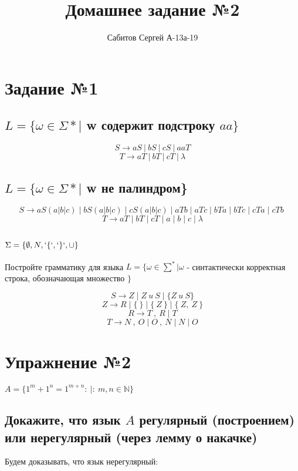 \documentclass[a4paper,12pt]{article}
\title{Домашнее задание №2}
\author{Сабитов Сергей А-13а-19}
\begin{document}
\maketitle


\section{Задание №1}
\subsection{$L = \{\omega \in \Sigma* |$  w содержит подстроку $aa\}$}

$$ S \rightarrow aS \:|\: bS \:|\: cS \:|\: aaT $$
$$ T \rightarrow aT \:|\: bT \:|\: cT \:|\: \lambda$$

\subsection{$L = \{\omega \in \Sigma* |$  w не палиндром\}}
$$S \rightarrow aS(a|b|c)\; | \; bS(a|b|c)\; | \;cS(a|b|c) \; | \; aTb \; | \; aTc\; | \; bTa\; | \;bTc \; | \;cTa \; | \;cTb \; $$
$$ T \rightarrow aT \; | \; bT \; | \; cT \; | \; a \; | \; b \; | \; c \; |\; \lambda$$

\subsection{$\Sigma = \{ \emptyset, N, `\{`,`\}`, \cup \} $ }
Постройте грамматику для языка $L = \{\omega \in  \sum^*|\omega $ - синтактически корректная строка, обозначающая множество $\}$ 


$$S \rightarrow Z\; | \;Z\: u\: S \;|\; \{Z\: u\: S\}$$
$$Z \rightarrow  R\; |\; \{\:\} \;|\; \{\:Z\:\}\; |\; \{\:Z,\:Z\:\}$$ 
$$R \rightarrow  T\:,\:R \;|\;T$$
$$T \rightarrow  N\:,\:O\;|\;O\:,\:N\;|\;N\;|\;O$$

\section{Упражнение №2}
 
    $A = \{1^m + 1^n = 1^{m+n} :\ | :\ m, n \in \mathbb{N}\}$
 
    \subsection{Докажите, что язык $A$ регулярный (построением) или нерегулярный (через лемму о накачке)}
 
        Будем доказывать, что язык нерегулярный:
 
\end{document}
